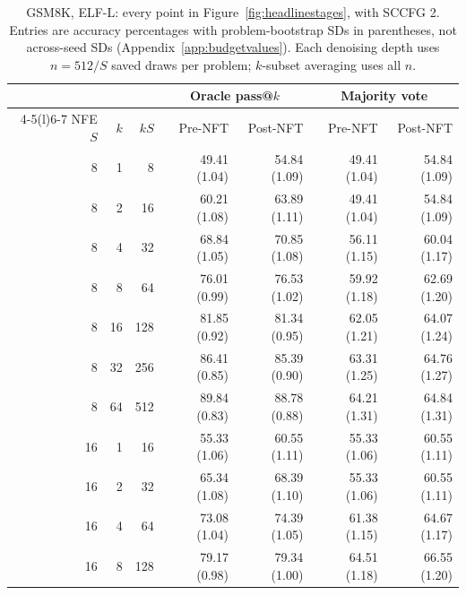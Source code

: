 \begin{table}[p]
\caption{GSM8K, ELF-L: every point in Figure~\ref{fig:headlinestages}, with SCCFG 2. Entries are accuracy percentages with problem-bootstrap SDs in parentheses, not across-seed SDs (Appendix~\ref{app:budgetvalues}). Each denoising depth uses $n=512/S$ saved draws per problem; $k$-subset averaging uses all $n$.}
\label{tab:budgetvaluesgsml}
\centering\small
\setlength{\tabcolsep}{5pt}
\begin{tabular}{@{}rrr rrrr@{}}
\toprule
& & & \multicolumn{2}{c}{Oracle pass@$k$} & \multicolumn{2}{c}{Majority vote} \\
\cmidrule(lr){4-5}\cmidrule(l){6-7}
NFE $S$ & $k$ & $kS$ & Pre-NFT & Post-NFT & Pre-NFT & Post-NFT \\
\midrule
8 & 1 & 8 & 49.41 {\scriptsize (1.04)} & 54.84 {\scriptsize (1.09)} & 49.41 {\scriptsize (1.04)} & 54.84 {\scriptsize (1.09)} \\
8 & 2 & 16 & 60.21 {\scriptsize (1.08)} & 63.89 {\scriptsize (1.11)} & 49.41 {\scriptsize (1.04)} & 54.84 {\scriptsize (1.09)} \\
8 & 4 & 32 & 68.84 {\scriptsize (1.05)} & 70.85 {\scriptsize (1.08)} & 56.11 {\scriptsize (1.15)} & 60.04 {\scriptsize (1.17)} \\
8 & 8 & 64 & 76.01 {\scriptsize (0.99)} & 76.53 {\scriptsize (1.02)} & 59.92 {\scriptsize (1.18)} & 62.69 {\scriptsize (1.20)} \\
8 & 16 & 128 & 81.85 {\scriptsize (0.92)} & 81.34 {\scriptsize (0.95)} & 62.05 {\scriptsize (1.21)} & 64.07 {\scriptsize (1.24)} \\
8 & 32 & 256 & 86.41 {\scriptsize (0.85)} & 85.39 {\scriptsize (0.90)} & 63.31 {\scriptsize (1.25)} & 64.76 {\scriptsize (1.27)} \\
8 & 64 & 512 & 89.84 {\scriptsize (0.83)} & 88.78 {\scriptsize (0.88)} & 64.21 {\scriptsize (1.31)} & 64.84 {\scriptsize (1.31)} \\
\midrule
16 & 1 & 16 & 55.33 {\scriptsize (1.06)} & 60.55 {\scriptsize (1.11)} & 55.33 {\scriptsize (1.06)} & 60.55 {\scriptsize (1.11)} \\
16 & 2 & 32 & 65.34 {\scriptsize (1.08)} & 68.39 {\scriptsize (1.10)} & 55.33 {\scriptsize (1.06)} & 60.55 {\scriptsize (1.11)} \\
16 & 4 & 64 & 73.08 {\scriptsize (1.04)} & 74.39 {\scriptsize (1.05)} & 61.38 {\scriptsize (1.15)} & 64.67 {\scriptsize (1.17)} \\
16 & 8 & 128 & 79.17 {\scriptsize (0.98)} & 79.34 {\scriptsize (1.00)} & 64.51 {\scriptsize (1.18)} & 66.55 {\scriptsize (1.20)} \\

\end{tabular}
\end{table}
